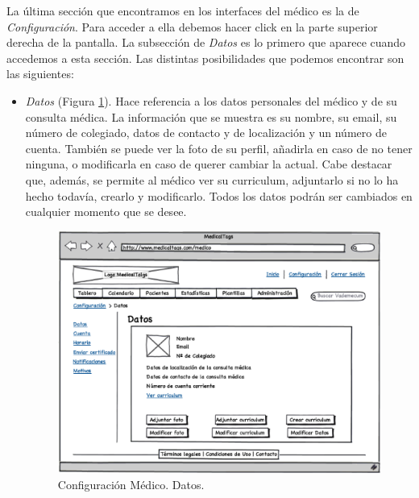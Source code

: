 		La última sección que encontramos en los interfaces del médico es la de \textit{Configuración}. Para acceder a ella debemos hacer click en la parte superior derecha de la pantalla. La subsección de \textit{Datos} es lo primero que aparece cuando accedemos a esta sección. Las distintas posibilidades que podemos encontrar son las siguientes:
		
		\begin{itemize}
			\item \textit{Datos} (Figura \ref{fig:configuracion_datos}). Hace referencia a los datos personales del médico y de su consulta médica. La información que se muestra es su nombre, su email, su número de colegiado, datos de contacto y de localización y un número de cuenta. También se puede ver la foto de su perfil, añadirla en caso de no tener ninguna, o modificarla en caso de querer cambiar la actual. Cabe destacar que, además, se permite al médico ver su curriculum, adjuntarlo si no lo ha hecho todavía, crearlo y modificarlo. Todos los datos podrán ser cambiados en cualquier momento que se desee.
			
			
			\begin{figure}[H]
			  \centering
			    \includegraphics[width=12cm]{img/eps/23_Configuracion_Medico.eps}
			  \caption{Configuración Médico. Datos.}
			  \label{fig:configuracion_datos}
			\end{figure}
			

\end{itemize}
